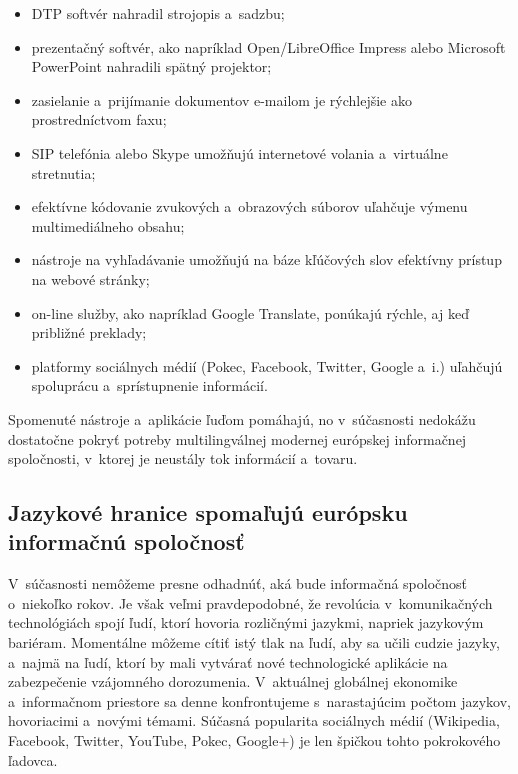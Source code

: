 \begin{multicols}{2}
\begin{itemize}
\item DTP softvér nahradil strojopis a~sadzbu;
\item prezentačný softvér, ako napríklad Open/Libre\-Office Impress alebo Microsoft PowerPoint nahradili spätný projektor;
\item zasielanie a~prijímanie dokumentov e-mailom je rýchlejšie ako prostredníctvom faxu;
\item SIP telefónia alebo Skype umožňujú internetové volania a~virtuálne stretnutia;
\item efektívne kódovanie zvukových a~obrazových súborov uľahčuje výmenu multimediálneho obsahu;
\item nástroje na vyhľadávanie umožňujú na báze kľúčových slov efektívny prístup na webové stránky;
\item on-line služby, ako napríklad Google Translate, ponúkajú rýchle, aj keď približné preklady;
\item platformy sociálnych médií (Pokec, Facebook, Twitter, Google a~i.) uľahčujú spoluprácu a~sprístupnenie informácií.
\end{itemize}

Spomenuté nástroje a~aplikácie ľuďom pomáhajú, no v~súčasnosti nedokážu dostatočne pokryť potreby multilingválnej modernej európskej informačnej spoločnosti, v~ktorej je neustály tok informácií a~tovaru.

\subsection{Jazykové hranice spomaľujú európsku informačnú spoločnosť}
V~súčasnosti nemôžeme presne odhadnúť, aká bude informačná
spoločnosť o~niekoľko rokov. Je však veľmi pravdepodobné, že
revolúcia v~komunikačných technológiách spojí ľudí, ktorí
hovoria rozličnými jazykmi, napriek jazykovým bariéram. Momentálne
môžeme cítiť istý tlak na ľudí, aby sa učili cudzie jazyky,
a~najmä na ľudí, ktorí by mali vytvárať nové technologické
aplikácie na zabezpečenie vzájomného dorozumenia.
V~aktuálnej globálnej ekonomike a~informačnom priestore sa denne
konfrontujeme s~narastajúcim počtom jazykov, hovoriacimi a~novými
témami. Súčasná popularita sociálnych médií (Wikipedia, Facebook,
Twitter, YouTube, Pokec, Google+) je len špičkou tohto pokrokového
ľadovca.



\end{multicols}
